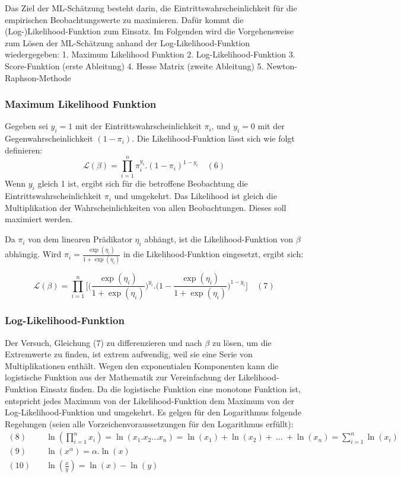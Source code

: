 \documentclass[12pt,]{article}
\begin{document}
Das Ziel der ML-Schätzung besteht darin, die Eintrittswahrscheinlichkeit
für die empirischen Beobachtungswerte zu maximieren. Dafür kommt die
(Log-)Likelihood-Funktion zum Einsatz. Im Folgenden wird die
Vorgehensweise zum Lösen der ML-Schätzung anhand der
Log-Likelihood-Funktion wiedergegeben: 1. Maximum Likelihood Funktion 2.
Log-Likelihood-Funktion 3. Score-Funktion (erste Ableitung) 4. Hesse
Matrix (zweite Ableitung) 5. Newton-Raphson-Methode

\subsubsection{Maximum Likelihood
Funktion}\label{maximum-likelihood-funktion}

Gegeben sei \(y_i = 1\) mit der Eintrittswahrscheinlichkeit \(\pi_i\),
und \(y_i = 0\) mit der Gegenwahrscheinlichkeit \((1-\pi_i)\). Die
Likelihood-Funktion lässt sich wie folgt definieren: \[
\mathcal{L}(\beta) = {\prod_{i=1}^{n} \pi_i^{y_i}.(1-\pi_i)^{1-y_i}} \quad (6)
\] Wenn \(y_i\) gleich 1 ist, ergibt sich für die betroffene Beobachtung
die Eintrittswahrscheinlichkeit \(\pi_i\) und umgekehrt. Das Likelihood
ist gleich die Multiplikation der Wahrscheinlichkeiten von allen
Beobachtungen. Dieses soll maximiert werden.

Da \(\pi_i\) von dem linearen Prädikator \(\eta_i\) abhängt, ist die
Likelihood-Funktion von \(\beta\) abhängig. Wird
\(\pi_i = \frac{\exp(\eta_i)}{1 + \exp(\eta_i)}\) in die
Likelihood-Funktion eingesetzt, ergibt sich:

\[
\mathcal{L}(\beta) = {\prod_{i=1}^{n} \Bigg[ \Big( \frac{\exp(\eta_i)}{1 + \exp(\eta_i)} \Big)^{y_i}.\Big(1-\frac{\exp(\eta_i)}{1 + \exp(\eta_i)}\Big)^{1-y_i}}\Bigg] \quad (7)
\]

\subsubsection{Log-Likelihood-Funktion}\label{log-likelihood-funktion}

Der Versuch, Gleichung (7) zu differenzieren und nach \(\beta\) zu
lösen, um die Extremwerte zu finden, ist extrem aufwendig, weil sie eine
Serie von Multiplikationen enthält. Wegen den exponentialen Komponenten
kann die logistische Funktion aus der Mathematik zur Vereinfachung der
Likelihood-Funktion Einsatz finden. Da die logistische Funktion eine
monotone Funktion ist, entspricht jedes Maximum von der
Likelihood-Funktion dem Maximum von der Log-Likelihood-Funktion und
umgekehrt. Es gelgen für den Logarithmus folgende Regelungen (seien alle
Vorzeichenvoraussetzungen für den Logarithmus erfüllt): \[
\begin{aligned}
(8) \quad &\ln(\prod_{i=1}^{n}x_i) = \ln(x_1.x_2...x_n) = \ln(x_1) + \ln(x_2) + \ ... \ + \ln(x_n) = \sum_{i=1}^{n} \ln(x_i) \\
(9) \quad &\ln(x^\alpha) = \alpha.\ln(x) \\
(10) \quad &\ln(\frac{x}{y}) = \ln(x) - \ln(y)
\end{aligned} 
\]
\end{document}

